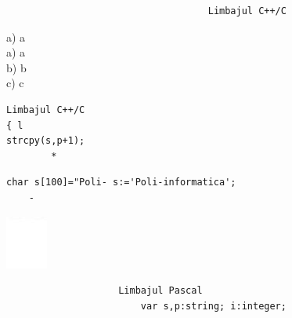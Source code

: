 \documentclass[10pt]{article}
\begin{document}
\begin{verbatim}
                                    Limbajul C++/C
\end{verbatim}

a) a\\
a) a\\
b) b\\
c) c

\begin{verbatim}
Limbajul C++/C
{ l
strcpy(s,p+1);
        *
\end{verbatim}

\begin{verbatim}
char s[100]="Poli- s:='Poli-informatica';
    -
\end{verbatim}

\begin{center}
\includegraphics[max width=\textwidth]{2025_04_17_46e04c6acd873ea9558dg-231(4)}
\end{center}

\begin{verbatim}
                    Limbajul Pascal
                        var s,p:string; i:integer;
\end{verbatim}
\end{document}
